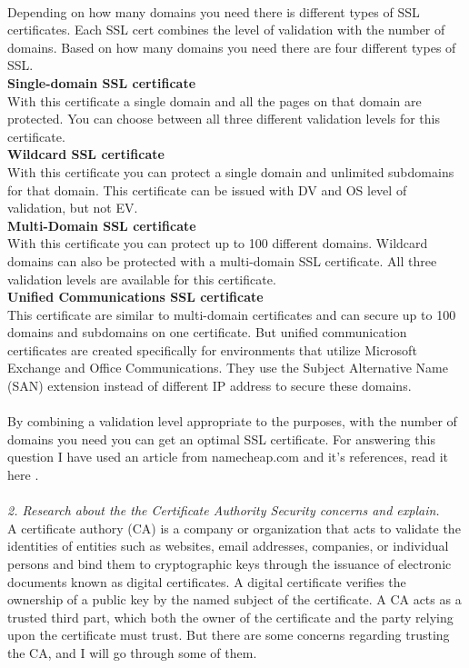 \documentclass[12pt, letterpaper]{article}
\begin{document}
\\
Depending on how many domains you need there is different types of SSL certificates. Each SSL cert combines the level of validation with the number of domains. Based on how many domains you need there are four different types of SSL.
\\
\textbf{Single-domain SSL certificate}
\\
With this certificate a single domain and all the pages on that domain are protected. You can choose between all three different validation levels for this certificate.
\\
\textbf{Wildcard SSL certificate}
\\
With this certificate you can protect a single domain and unlimited subdomains for that domain. This certificate can be issued with DV and OS level of validation, but not EV.
\\
\textbf{Multi-Domain SSL certificate}
\\
With this certificate you can protect up to 100 different domains. Wildcard domains can also be protected with a multi-domain SSL certificate. All three validation levels are available for this certificate.
\\
\textbf{Unified Communications SSL certificate}
\\
This certificate are similar to multi-domain certificates and can secure up to 100 domains and subdomains on one certificate. But unified communication certificates are created specifically for environments that utilize Microsoft Exchange and Office Communications. They use the Subject Alternative Name (SAN) extension instead of different IP address to secure these domains.
\\\\
By combining a validation level appropriate to the purposes, with the number of domains you need you can get an optimal SSL certificate. For answering this question I have used an article from namecheap.com and it's references, read it here \cite{ssl}.
\\\\
\textit{2. Research about the the Certificate Authority Security concerns and explain.}\\
A certificate authory (CA) is a company or organization that acts to validate the identities of entities such as websites, email addresses, companies, or individual persons and bind them to cryptographic keys through the issuance of electronic documents known as digital certificates. A digital certificate verifies the ownership of a public key by the named subject of the certificate. A CA acts as a trusted third part, which both the owner of the certificate and the party relying upon the certificate must trust. But there are some concerns regarding trusting the CA, and I will go through some of them.
\end{document}
